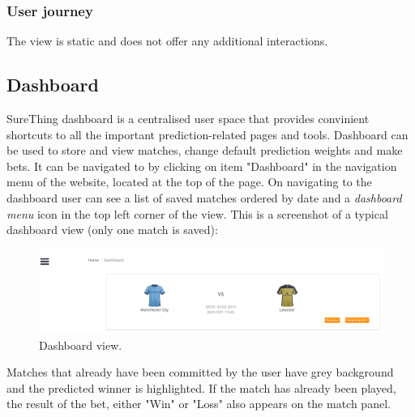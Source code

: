 \subsubsection*{User journey}
\label{subsec:playedmatchviewuserjourney}
The view is static and does not offer any additional interactions.

\subsection{Dashboard}
\label{subsec:dashboard}
SureThing dashboard is a centralised user space that provides convinient shortcuts to all the important prediction-related pages and tools. Dashboard can be used to store and view matches, change default prediction weights and make bets. It can be navigated to by clicking on item "Dashboard" in the navigation menu of the website, located at the top of the page. On navigating to the dashboard user can see a list of saved matches ordered by date and a \emph{dashboard menu} icon in the top left corner of the view. This is a screenshot of a typical dashboard view (only one match is saved):

\begin{figure}[H]
	\begin{center}
		\includegraphics[width=.90\columnwidth]{impl/images/typicalDashboard}
		\caption{Dashboard view.} \label{fig:typicaldashboard}
	\end{center}
\end{figure}

Matches that already have been committed by the user have grey background and the predicted winner is highlighted. If the match has already been played, the result of the bet, either "Win" or "Loss" also appears on the match panel.

